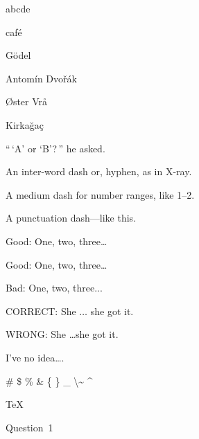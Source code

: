 \documentclass[11pt]{article}
\begin{document}
\textgreek{abcde}

caf\'e

G\"odel

Antom{\'i}n Dvo\v{r}\'ak

{\O}ster Vr\r{a}

Kirka\u{g}a\c{c}


``\,`A' or `B'?\,'' he asked.


An inter-word dash or, hyphen, as in X-ray.

A medium dash for number ranges, like 1--2.

A punctuation dash---like this.

Good: One, two, three\ldots

Good: One, two, three\dots

Bad: One, two, three...

CORRECT: She $\ldots$ she got it.

WRONG: She \ldots she got it.

I've no idea\ldots.

\# \quad \$ \quad \quad \quad \quad \quad \% \quad \& \quad
\{ \quad \} \quad \_ \quad
\textbackslash \quad \~{} \quad \^{}

\TeX

Question~1
\end{document}
